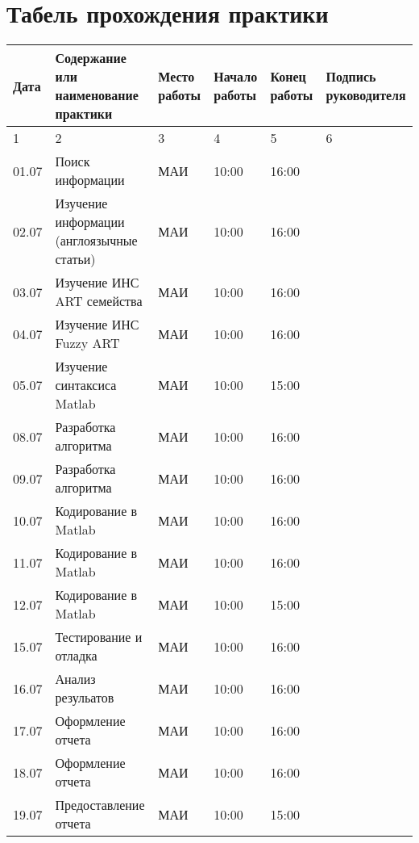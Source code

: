 \newpage
\section{Табель прохождения практики}

\begin{table}[h]
\begin{tabular}{|p{1cm}|p{6cm}|p{1.5cm}|p{1.5cm}|p{1.5cm}|p{2cm}|}
\hline
Дата  & Содержание или наименование практики & Место работы & Начало работы & Конец работы & Подпись руководителя \\ \hline
1     & 2                                    & 3            & 4             & 5            & 6         \\ \hline
01.07 & Поиск информации                     &  МАИ            & 10:00         & 16:00        &           \\ \hline
02.07 & Изучение информации (англоязычные статьи) & МАИ        & 10:00         & 16:00        &           \\ \hline
03.07 & Изучение ИНС ART семейства           & МАИ        & 10:00         & 16:00        &           \\ \hline
04.07 & Изучение ИНС Fuzzy ART               & МАИ        & 10:00         & 16:00        &           \\ \hline
05.07 & Изучение синтаксиса Matlab           & МАИ             & 10:00         & 15:00        &           \\ \hline
08.07 & Разработка алгоритма                 & МАИ             & 10:00         & 16:00        &           \\ \hline
09.07 & Разработка алгоритма                 & МАИ             & 10:00         & 16:00        &           \\ \hline
10.07 & Кодирование   в Matlab               & МАИ             & 10:00         & 16:00        &           \\ \hline
11.07 & Кодирование   в Matlab               & МАИ             & 10:00         & 16:00        &           \\ \hline
12.07 & Кодирование   в Matlab               & МАИ             & 10:00         & 15:00        &           \\ \hline
15.07 & Тестирование и отладка               & МАИ             & 10:00         & 16:00        &           \\ \hline
16.07 & Анализ резульатов                    & МАИ             & 10:00         & 16:00        &           \\ \hline
17.07 & Оформление отчета                    & МАИ             & 10:00         & 16:00        &           \\ \hline
18.07 & Оформление отчета                    & МАИ             & 10:00         & 16:00        &           \\ \hline
19.07 & Предоставление отчета                & МАИ             & 10:00         & 15:00        &           \\ \hline

\end{tabular}
\end{table}